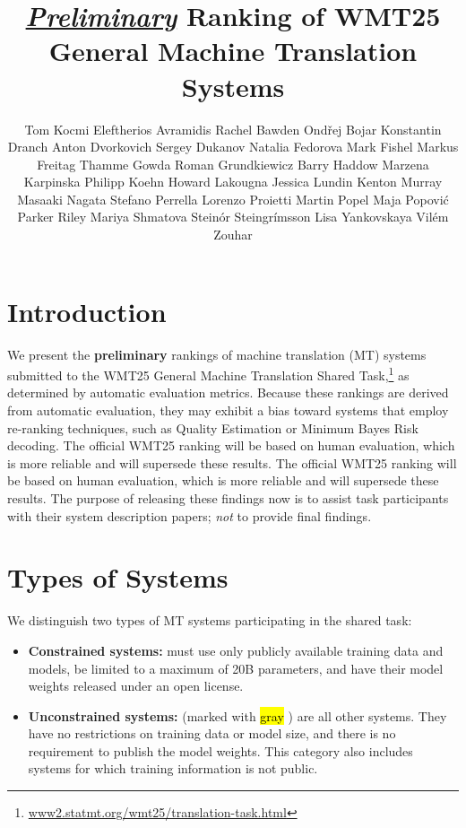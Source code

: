 \documentclass[11pt]{article}
\title{\underline{\textit{Preliminary}} Ranking of WMT25 General Machine Translation Systems}
\author{
  \null \AND
  Tom Kocmi  
  \And
  Eleftherios Avramidis 
  \And
  Rachel Bawden 
  \And
  Ond\v{r}ej Bojar
  \And
  Konstantin Dranch
  \AND
  Anton Dvorkovich 
  \And
  Sergey Dukanov 
  \And
  Natalia Fedorova 
  \And
  Mark Fishel  
  \And
  Markus Freitag
  \AND
  Thamme Gowda
  \And
  Roman Grundkiewicz
  \And
  Barry Haddow  
  \And
  Marzena Karpinska 
  \AND
  Philipp Koehn 
  \And
  Howard Lakougna
  \And
  Jessica Lundin
  \And
  Kenton Murray 
  \And
  Masaaki Nagata
  \AND
  Stefano Perrella 
  \And
  Lorenzo Proietti
  \And
  Martin Popel 
  \And 
  Maja Popovi\'{c}  
  \And
  Parker Riley 
  \AND
  Mariya Shmatova 
  \And
  Stein\th\'{o}r Steingr\'{i}msson 
  \And
  Lisa Yankovskaya 
  \And 
  Vilém Zouhar
  \vspace{2cm}
}
\newcommand{\hlc}[2][yellow]{{%
    \colorlet{foo}{#1}%
    \sethlcolor{foo}\hl{#2}}%
}
\begin{document}
\maketitle


\section*{Introduction}

We present the \textbf{preliminary} rankings of machine translation (MT) systems submitted to the WMT25 General Machine Translation Shared Task,\footnote{\href{https://www2.statmt.org/wmt25/translation-task.html}{www2.statmt.org/wmt25/translation-task.html}} as determined by automatic evaluation metrics. Because these rankings are derived from automatic evaluation, they may exhibit a bias toward systems that employ re-ranking techniques, such as Quality Estimation or Minimum Bayes Risk decoding. The official WMT25 ranking will be based on human evaluation, which is more reliable and will supersede these results. The official WMT25 ranking will be based on human evaluation, which is more reliable and will supersede these results. The purpose of releasing these findings now is to assist task participants with their system description papers; \textit{not} to provide final findings.


\section*{Types of Systems}

We distinguish two types of MT systems participating in the shared task:
\begin{itemize}%
\item \textbf{Constrained systems:} must use only publicly available training data and models, be limited to a maximum of 20B parameters, and have their model weights released under an open license.

\item \textbf{Unconstrained systems:} (marked with \hlc[gray!30]{gray}) are all other systems. They have no restrictions on training data or model size, and there is no requirement to publish the model weights. This category also includes systems for which training information is not public.

\end{itemize}
\end{document}

